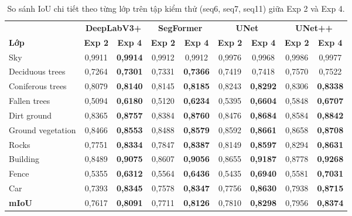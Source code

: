 \begin{table}[H]
\centering
\caption{So sánh IoU chi tiết theo từng lớp trên tập kiểm thử (seq6, seq7, seq11) giữa Exp 2 và Exp 4.}
\label{tab:per_class_detail}
\small
\begin{tabular}{l c c c c c c c c}
\toprule
 & \multicolumn{2}{c}{\textbf{DeepLabV3+}} & \multicolumn{2}{c}{\textbf{SegFormer}} & \multicolumn{2}{c}{\textbf{UNet}} & \multicolumn{2}{c}{\textbf{UNet++}} \\
\cmidrule(lr){2-3} \cmidrule(lr){4-5} \cmidrule(lr){6-7} \cmidrule(lr){8-9}
\textbf{Lớp} & \textbf{Exp 2} & \textbf{Exp 4} & \textbf{Exp 2} & \textbf{Exp 4} & \textbf{Exp 2} & \textbf{Exp 4} & \textbf{Exp 2} & \textbf{Exp 4} \\
\midrule
Sky                & 0,9911 & \textbf{0,9914} & 0,9912 & 0,9912 & 0,9976 & 0,9968 & 0,9986 & 0,9977 \\
Deciduous trees    & 0,7264 & \textbf{0,7301} & 0,7331 & \textbf{0,7366} & 0,7419 & 0,7418 & 0,7570 & 0,7522 \\
Coniferous trees   & 0,8079 & \textbf{0,8140} & 0,8145 & \textbf{0,8185} & 0,8243 & \textbf{0,8292} & 0,8306 & \textbf{0,8338} \\
Fallen trees       & 0,5094 & \textbf{0,6180} & 0,5120 & \textbf{0,6234} & 0,5395 & \textbf{0,6604} & 0,5848 & \textbf{0,6707} \\
Dirt ground        & 0,8365 & \textbf{0,8757} & 0,8384 & \textbf{0,8760} & 0,8476 & \textbf{0,8684} & 0,8584 & \textbf{0,8842} \\
Ground vegetation  & 0,8466 & \textbf{0,8553} & 0,8488 & \textbf{0,8579} & 0,8592 & \textbf{0,8661} & 0,8658 & \textbf{0,8708} \\
Rocks              & 0,7751 & \textbf{0,8334} & 0,7847 & \textbf{0,8387} & 0,8149 & \textbf{0,8597} & 0,8294 & \textbf{0,8631} \\
Building           & 0,8489 & \textbf{0,9075} & 0,8607 & \textbf{0,9056} & 0,8655 & \textbf{0,9187} & 0,8778 & \textbf{0,9268} \\
Fence              & 0,5355 & \textbf{0,6312} & 0,5564 & \textbf{0,6436} & 0,5435 & \textbf{0,6940} & 0,5581 & \textbf{0,7031} \\
Car                & 0,7393 & \textbf{0,8345} & 0,7578 & \textbf{0,8347} & 0,7756 & \textbf{0,8630} & 0,7938 & \textbf{0,8715} \\
\midrule
\textbf{mIoU}      & 0,7617 & \textbf{0,8091} & 0,7711 & \textbf{0,8126} & 0,7810 & \textbf{0,8298} & 0,7956 & \textbf{0,8374} \\
\bottomrule
\end{tabular}
\end{table}

